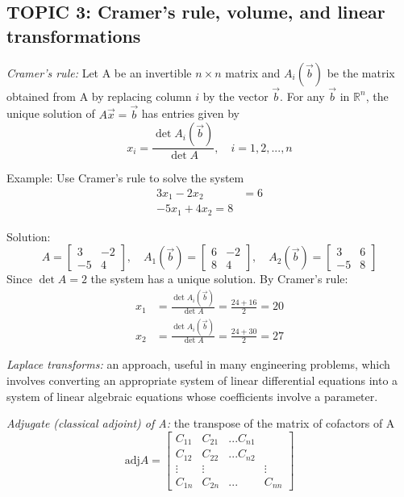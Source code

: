 \documentclass[12pt]{article} %
\newcommand{\R}{\mathbb{R}}
\begin{document}

\subsection{TOPIC 3: Cramer's rule, volume, and linear transformations}
\emph{Cramer's rule:} Let A be an invertible $n \times n$ matrix and $A_i(\vec{b})$ be the matrix obtained from A by replacing column $i$ by the vector $\vec{b}$. For any $\vec{b}$ in $\R^n$, the unique solution of $A\vec{x} = \vec{b}$ has entries given by 
$$x_i = \frac{\det A_i(\vec{b})}{\det A}, \quad i = 1, 2, ..., n$$

Example: Use Cramer's rule to solve the system
\begin{align}
	3x_1 - 2x_2 &= 6\\
	-5x_1 + 4x_2 = 8
\end{align}

Solution: 
$$A=\begin{bmatrix}
	3 & -2\\
	-5 & 4
\end{bmatrix}, \quad A_1(\vec{b}) = \begin{bmatrix}
	6 & -2\\
	8 & 4
\end{bmatrix}, \quad A_2(\vec{b}) = \begin{bmatrix}
	3 & 6\\
	-5 & 8
\end{bmatrix}$$
Since $\det A = 2$ the system has a unique solution. By Cramer's rule:
\begin{align*}
	x_1 &= \frac{\det A_i(\vec{b})}{\det A} = \frac{24 + 16}{2} = 20\\
	x_2 &= \frac{\det A_i(\vec{b})}{\det A} = \frac{24 + 30}{2} = 27
\end{align*}

\emph{Laplace transforms:} an approach, useful in many engineering problems, which involves converting an appropriate system of linear differential equations into a system of linear algebraic equations whose coefficients involve a parameter.

\emph{Adjugate (classical adjoint) of A:} the transpose of the matrix of cofactors of A
$$\text{adj}A = \begin{bmatrix}
	C_{11} & C_{21} & ... C_{n1}\\
	C_{12} & C_{22} & ... C_{n2}\\
	\vdots & \vdots & & \vdots\\
	C_{1n} & C_{2n} & ... & C_{nn}
\end{bmatrix}$$
\end{document}
